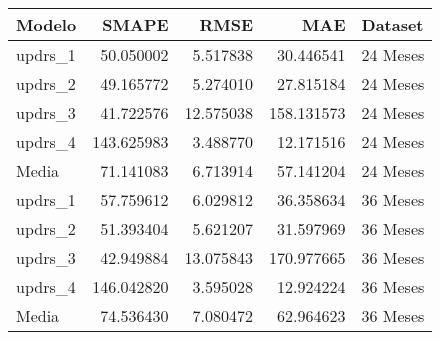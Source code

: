 \begin{tabular}{lrrrl}
\toprule
Modelo & SMAPE & RMSE & MAE & Dataset \\
\midrule
updrs_1 & 50.050002 & 5.517838 & 30.446541 & 24 Meses \\
updrs_2 & 49.165772 & 5.274010 & 27.815184 & 24 Meses \\
updrs_3 & 41.722576 & 12.575038 & 158.131573 & 24 Meses \\
updrs_4 & 143.625983 & 3.488770 & 12.171516 & 24 Meses \\
Media & 71.141083 & 6.713914 & 57.141204 & 24 Meses \\
updrs_1 & 57.759612 & 6.029812 & 36.358634 & 36 Meses \\
updrs_2 & 51.393404 & 5.621207 & 31.597969 & 36 Meses \\
updrs_3 & 42.949884 & 13.075843 & 170.977665 & 36 Meses \\
updrs_4 & 146.042820 & 3.595028 & 12.924224 & 36 Meses \\
Media & 74.536430 & 7.080472 & 62.964623 & 36 Meses \\
\bottomrule
\end{tabular}
